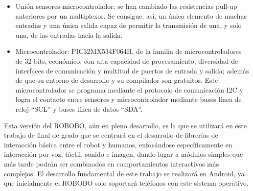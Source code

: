 \begin{itemize}
\begin{itemize}
	\end{itemize}
	\item Unión sensores-microcontrolador: se han cambiado las resistencias pull-up anteriores por un multiplexor. Se consigue, así, un único elemento de muchas entradas y una única salida capaz de permitir la transmisión de una, y solo una, de las entradas hacia la salida.

	\item Microcontrolador: PIC32MX534F064H, de la familia de microcontroladores de 32 bits, económico, con alta capacidad de procesamiento, diversidad de interfaces de comunicación y multitud de puertos de entrada y salida; además de que su entorno de desarrollo y su compilador son gratuitos. Este microcontrolador se programa mediante el protocolo de comunicación I2C y logra el contacto entre sensores y microcontrolador mediante buses línea de reloj “SCL” y buses línea de datos “SDA”.




\end{itemize}

Esta versión del ROBOBO, aún en pleno desarrollo, es la que se utilizará en este trabajo de final de grado que se centrará en el desarrollo de  librerías de interacción básica entre el robot y humanos, enfocándose específicamente en interacción por voz, táctil, sonido e imagen, dando lugar a módulos simples que más tarde podrán ser combinados en comportamientos interactivos más complejos. El desarrollo fundamental de este trabajo se realizará en Android, ya que inicialmente el ROBOBO solo soportará teléfonos con este sistema operativo. 


